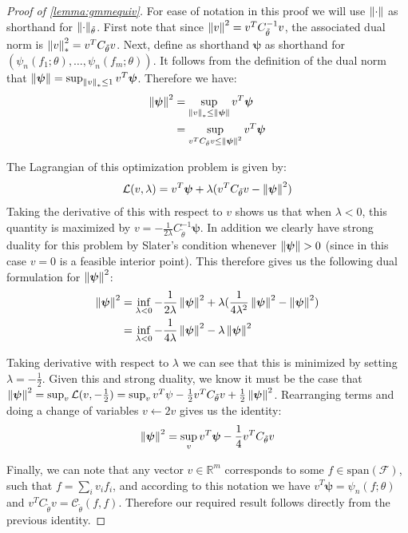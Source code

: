 \documentclass{article}
\theoremstyle{plain}
\theoremstyle{definition}
\begin{document}
\begin{proof}[Proof of \cref{lemma:gmmequiv}]
For ease of notation in this proof we will use $\left\|\cdot\right\|$ as shorthand for $\left\|\cdot\right\|_{\tilde\theta}$. First note that since $\left\|v\right\|^2 = v^T C_{\tilde\theta}^{-1} v$, the associated dual norm is $\left\|v\right\|_*^2 = v^T C_{\tilde\theta} v$. Next, define as shorthand $\bm\psi$ as shorthand for $(\psi_n(f_1;\theta), \ldots, \psi_n(f_m;\theta))$. It follows from the definition of the dual norm that $\left\|\bm\psi\right\| = \sup_{\left\|v\right\|_* \leq 1} v^T \bm\psi$. Therefore we have:
\begin{align}
    \left\|\bm\psi\right\|^2 &= \sup_{\left\|v\right\|_* \leq \left\|\bm\psi\right\|} v^T \bm\psi \nonumber \\
    &= \sup_{v^T C_{\tilde\theta} v \leq \left\|\bm\psi\right\|^2} v^T \bm\psi \nonumber 
\end{align}

The Lagrangian of this optimization problem is given by:
\begin{equation}
    \mathcal{L}(v,\lambda) = v^T \bm\psi + \lambda (v^T C_{\tilde\theta} v - \left\|\bm\psi\right\|^2) \nonumber
\end{equation}
Taking the derivative of this with respect to $v$ shows us that when $\lambda < 0$, this quantity is maximized by $v = -\frac{1}{2\lambda} C_{\tilde\theta}^{-1} \bm\psi$. In addition we clearly have strong duality for this problem by Slater's condition whenever $\left\|\bm\psi\right\| > 0$ (since in this case $v = 0$ is a feasible interior point). This therefore gives us the following dual formulation for $\left\|\bm\psi\right\|^2$:
\begin{align}
    \left\|\bm\psi\right\|^2 &= \inf_{\lambda < 0} -\frac{1}{2\lambda} \left\|\bm\psi\right\|^2 + \lambda(\frac{1}{4\lambda^2} \left\|\bm\psi\right\|^2 - \left\|\bm\psi\right\|^2) \nonumber \\
    &= \inf_{\lambda < 0} -\frac{1}{4 \lambda} \left\|\bm\psi\right\|^2 - \lambda \left\|\bm\psi\right\|^2 \nonumber
\end{align}

Taking derivative with respect to $\lambda$ we can see that this is minimized by setting $\lambda = -\frac{1}{2}$. Given this and strong duality, we know it must be the case that $\left\|\bm\psi\right\|^2 = \sup_v \mathcal{L}(v, -\frac{1}{2}) = \sup_v v^T \psi - \frac{1}{2} v^T C_{\tilde\theta} v + \frac{1}{2} \left\|\bm\psi\right\|^2$. Rearranging terms and doing a change of variables $v\leftarrow 2v$ gives us the identity:
\begin{equation}
    \left\|\bm\psi\right\|^2 = \sup_v v^T \bm\psi - \frac{1}{4} v^T C_{\tilde\theta} v \nonumber
\end{equation}

Finally, we can note that any vector $v \in \mathbb{R}^m$ corresponds to some $f\in \text{span}(\mathcal{F})$, such that $f = \sum_i v_i f_i$, and according to this notation we have $v^T \bm\psi = \psi_n(f;\theta)$ and $v^T C_{\tilde\theta} v = \mathcal{C}_{\tilde\theta}(f, f)$. Therefore our required result follows directly from the previous identity.
\end{proof}
\end{document}
